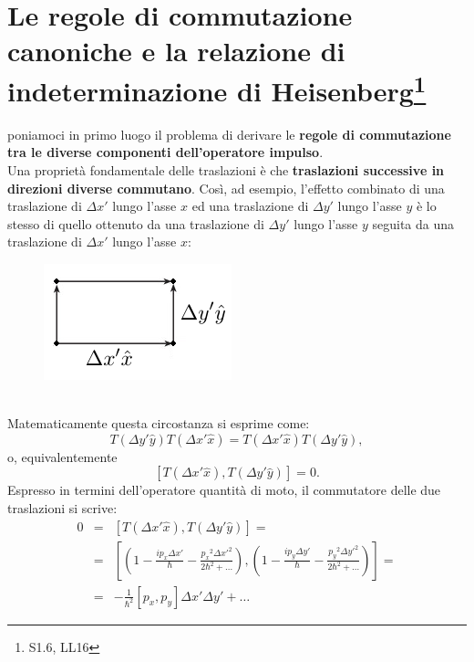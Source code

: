 \section[Le regole di commutazione canoniche e la relazione di indeterminazione di Heisenberg]{Le regole di commutazione canoniche e la relazione di indeterminazione di Heisenberg\footnote{S1.6, LL16}}
poniamoci in primo luogo il problema di derivare le \textbf{regole di commutazione tra le diverse componenti dell'operatore impulso}.\\
Una proprietà fondamentale delle traslazioni è che \textbf{traslazioni successive in direzioni diverse commutano}. Così, ad esempio, l'effetto combinato di una traslazione di $\Delta x'$ lungo l'asse $x$ ed una traslazione di $\Delta y'$ lungo l'asse $y$ è lo stesso di quello ottenuto da una traslazione di $\Delta y'$ lungo l'asse $y$ seguita da una traslazione di $\Delta x'$ lungo l'asse $x$:\\
\begin{figure}[!htbp]
\begin{center}
\includegraphics[scale=.8]{immagini/cap_7/fig7_1.png}
\end{center}
\end{figure}\\
Matematicamente questa circostanza si esprime come:
\begin{equation}
T(\Delta y'\hat{y})T(\Delta x'\hat{x})= T(\Delta x'\hat{x})T(\Delta y'\hat{y}),
\end{equation}
o, equivalentemente
\begin{equation}
\left[ T(\Delta x'\hat{x}), T(\Delta y'\hat{y})\right] =0.
\end{equation}
Espresso in termini dell'operatore quantità di moto, il commutatore delle due traslazioni si scrive:
\begin{eqnarray}
0 & = & \left[ T(\Delta x'\hat{x}), T(\Delta y'\hat{y})\right] =   \nonumber \\
 & = & \left[\left( 1-\frac{i p_x \Delta x'}{\hbar}-\frac{ {p_x} ^2 {\Delta x'}^2}{2\hbar ^2+\dots}\right), \left( 1-\frac{i p_y \Delta y'}{\hbar}-\frac{ {p_y} ^2 {\Delta y'}^2}{2\hbar ^2+\dots}\right) \right] = \nonumber  \\
& = & -\frac{1}{\hbar ^2}\left[p_x, p_y \right]\Delta x' \Delta y' + \dots
\end{eqnarray}
